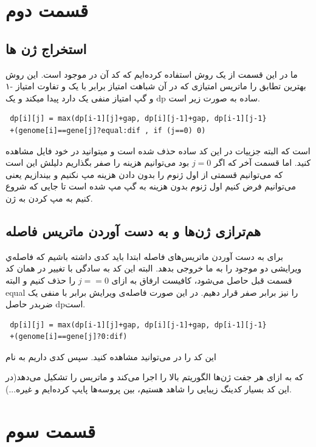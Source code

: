 \documentclass[11pt]{article}
\begin{document}
\section{قسمت دوم}
\subsection{استخراج ژن ها}
ما در این قسمت از یک روش 
استفاده کرده‌ایم که کد آن در 
موجود است. این روش بهترین تطابق را ماتریس امتیازی که در آن شباهت امتیاز برابر با یک و تفاوت امتیاز -۱ و گپ امتیاز منفی یک دارد پیدا میکند
 و یک dp ساده به صورت زیر است.
 \begin{latin}
 \begin{lstlisting}
 dp[i][j] = max(dp[i-1][j]+gap, dp[i][j-1]+gap, dp[i-1][j-1}
 +(genome[i]==gene[j]?equal:dif , if (j==0) 0)
 \end{lstlisting}
 \end{latin}
 است که البته جزییات در این کد ساده حذف شده است و میتوانید در خود فایل مشاهده کنید. اما قسمت آخر که اگر 
 $j = 0$
 بود می‌توانیم هزینه را صفر بگذاریم دلیلش این است که می‌توانیم قسمتی از اول ژنوم را بدون دادن هزینه مپ نکنیم و بیندازیم یعنی می‌توانیم فرض کنیم اول ژنوم بدون هزینه به گپ مپ شده است تا جایی که شروع کنیم به مپ کردن به ژن.
\subsection{هم‌ترازی ژن‌ها و به دست آوردن ماتریس فاصله}
برای به دست آوردن ماتریس‌های فاصله ابتدا باید کدی داشته باشیم که فاصله‌ي ویرایشی دو موجود را به ما خروجی بدهد. البته این کد به سادگی با تغییر در همان کد قسمت قبل حاصل می‌شود، کافیست ارفاق به ازای 
$j == 0$
را حذف کنیم و البته equal را نیز برابر صفر قرار دهیم. در این صورت فاصله‌ی ویرایش برابر با منفی یک ضربدر حاصل dpاست.
 \begin{latin}
 \begin{lstlisting}
 dp[i][j] = max(dp[i-1][j]+gap, dp[i][j-1]+gap, dp[i-1][j-1}
 +(genome[i]==gene[j]?0:dif)
 \end{lstlisting}
 \end{latin}
 این کد را در 
 می‌توانید مشاهده کنید.
 سپس کدی داریم به نام 
 
 که به ازای هر جفت ژن‌ها الگوریتم بالا را اجرا می‌کند و ماتریس را تشکیل می‌دهد(در این کد بسیار کدینگ زیبایی را شاهد هستیم، بین پروسه‌ها پایپ کرده‌ایم و غیره...).
\section{قسمت سوم}
\end{document}
